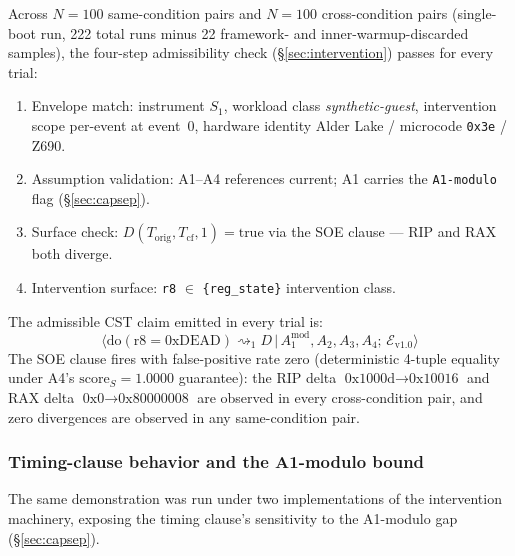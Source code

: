 \documentclass[conference]{IEEEtran}
\newcommand{\Korig}{T_\text{orig}}
\newcommand{\Tcf}{T_\text{cf}}
\newcommand{\scoreS}{\text{score}_S}
\begin{document}
Across $N{=}100$ same-condition pairs and $N{=}100$ cross-condition
pairs (single-boot run, 222 total runs minus 22 framework- and
inner-warmup-discarded samples), the four-step admissibility check
(\S\ref{sec:intervention}) passes for every trial:
\begin{enumerate}[label=(\arabic*)]
\item Envelope match: instrument $S_1$, workload class
  \textit{synthetic-guest}, intervention scope per-event at event~0,
  hardware identity Alder Lake / microcode \texttt{0x3e} / Z690.
\item Assumption validation: A1--A4 references current; A1 carries
  the \texttt{A1-modulo} flag (\S\ref{sec:capsep}).
\item Surface check: $D(\Korig, \Tcf, 1) = \text{true}$ via the SOE
  clause --- RIP and RAX both diverge.
\item Intervention surface: \texttt{r8} $\in$ \texttt{\{reg\_state\}}
  intervention class.
\end{enumerate}
The admissible CST claim emitted in every trial is:
\begin{equation*}
\big\langle \text{do}(\text{r8}{=}\text{0xDEAD}) \rightsquigarrow_{1}
D \,\big|\, A_1^{\text{mod}}, A_2, A_3, A_4;\, \mathcal{E}_{\text{v1.0}} \big\rangle
\end{equation*}
The SOE clause fires with false-positive rate zero (deterministic
4-tuple equality under A4's $\scoreS{=}1.0000$ guarantee): the RIP
delta $\text{0x1000d} \to \text{0x10016}$ and RAX delta
$\text{0x0} \to \text{0x80000008}$ are observed in every
cross-condition pair, and zero divergences are observed in any
same-condition pair.

\subsubsection{Timing-clause behavior and the A1-modulo bound}

The same demonstration was run under two implementations of the
intervention machinery, exposing the timing clause's sensitivity to
the A1-modulo gap (\S\ref{sec:capsep}).
\end{document}
